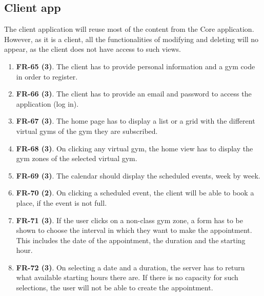 \documentclass[a4paper, 12pt, oneside]{book}
\begin{document}
\subsection{Client app}
The client application will reuse most of the content from the Core application. However, as it is a client, all the functionalities of modifying and deleting will no appear, as the client does not have access to such views.
\begin{enumerate}[label = -]
	\item \textbf{FR-65 (3)}. The client has to provide personal information and a gym code in order to register.
	\item \textbf{FR-66 (3)}. The client has to provide an email and password to access the application (log in).
	\item \textbf{FR-67 (3)}. The home page has to display a list or a grid with the different virtual gyms of the gym they are subscribed.
	\item \textbf{FR-68 (3)}. On clicking any virtual gym, the home view has to display the gym zones of the selected virtual gym.
	\item \textbf{FR-69 (3)}. The calendar should display the scheduled events, week by week.
	\item \textbf{FR-70 (2)}. On clicking a scheduled event, the client will be able to book a place, if the event is not full.
	\item \textbf{FR-71 (3)}. If the user clicks on a non-class gym zone, a form has to be shown to choose the interval in which they want to make the appointment. This includes the date of the appointment, the duration and the starting hour.
	\item \textbf{FR-72 (3)}. On selecting a date and a duration, the server has to return what available starting hours there are. If there is no capacity for such selections, the user will not be able to create the appointment.
\end{enumerate}
\end{document}
